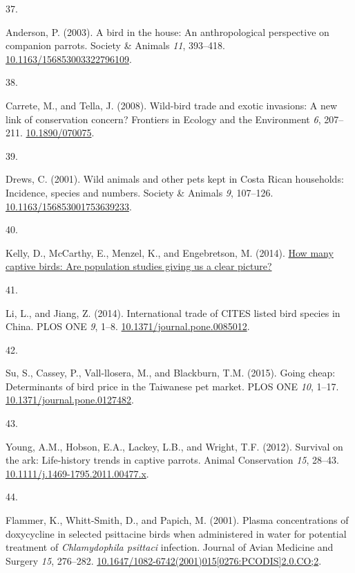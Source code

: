 \documentclass[
  man, donotrepeattitle,floatsintext]{apa6}
\newlength{\cslhangindent}
\newlength{\csllabelwidth}
\newlength{\cslentryspacingunit} %
\newenvironment{CSLReferences}[2] %
 {%
  \setlength{\parindent}{0pt}
  \ifodd #1
  \let\oldpar\par
  \def\par{\hangindent=\cslhangindent\oldpar}
  \fi
  \setlength{\parskip}{#2\cslentryspacingunit}
 }%
 {}
\newcommand{\CSLLeftMargin}[1]{\parbox[t]{\csllabelwidth}{#1}}
\newcommand{\CSLRightInline}[1]{\parbox[t]{\linewidth - \csllabelwidth}{#1}\break}
\begin{document}
\begin{CSLReferences}{0}{0}
\leavevmode{}%
\CSLLeftMargin{37. }%
\CSLRightInline{Anderson, P. (2003). A bird in the house: An anthropological perspective on companion parrots. Society \& Animals \emph{11}, 393--418. \href{https://doi.org/10.1163/156853003322796109}{10.1163/156853003322796109}.}

\leavevmode{}%
\CSLLeftMargin{38. }%
\CSLRightInline{Carrete, M., and Tella, J. (2008). Wild-bird trade and exotic invasions: A new link of conservation concern? Frontiers in Ecology and the Environment \emph{6}, 207--211. \href{https://doi.org/10.1890/070075}{10.1890/070075}.}

\leavevmode{}%
\CSLLeftMargin{39. }%
\CSLRightInline{Drews, C. (2001). Wild animals and other pets kept in {C}osta {R}ican households: Incidence, species and numbers. Society \& Animals \emph{9}, 107--126. \href{https://doi.org/10.1163/156853001753639233}{10.1163/156853001753639233}.}

\leavevmode{}%
\CSLLeftMargin{40. }%
\CSLRightInline{Kelly, D., McCarthy, E., Menzel, K., and Engebretson, M. (2014). \href{https://www.avianwelfare.org/issues/overview.htm}{How many captive birds: Are population studies giving us a clear picture?}}

\leavevmode{}%
\CSLLeftMargin{41. }%
\CSLRightInline{Li, L., and Jiang, Z. (2014). International trade of {CITES} listed bird species in {C}hina. PLOS ONE \emph{9}, 1--8. \href{https://doi.org/10.1371/journal.pone.0085012}{10.1371/journal.pone.0085012}.}

\leavevmode{}%
\CSLLeftMargin{42. }%
\CSLRightInline{Su, S., Cassey, P., Vall-llosera, M., and Blackburn, T.M. (2015). Going cheap: Determinants of bird price in the {T}aiwanese pet market. PLOS ONE \emph{10}, 1--17. \href{https://doi.org/10.1371/journal.pone.0127482}{10.1371/journal.pone.0127482}.}

\leavevmode{}%
\CSLLeftMargin{43. }%
\CSLRightInline{Young, A.M., Hobson, E.A., Lackey, L.B., and Wright, T.F. (2012). Survival on the ark: Life-history trends in captive parrots. Animal Conservation \emph{15}, 28--43. \href{https://doi.org/10.1111/j.1469-1795.2011.00477.x}{10.1111/j.1469-1795.2011.00477.x}.}

\leavevmode{}%
\CSLLeftMargin{44. }%
\CSLRightInline{Flammer, K., Whitt-Smith, D., and Papich, M. (2001). Plasma concentrations of doxycycline in selected psittacine birds when administered in water for potential treatment of \emph{{C}hlamydophila psittaci} infection. Journal of Avian Medicine and Surgery \emph{15}, 276--282. \href{https://doi.org/10.1647/1082-6742(2001)015\%5B0276:PCODIS\%5D2.0.CO;2}{10.1647/1082-6742(2001)015{[}0276:PCODIS{]}2.0.CO;2}.}


\end{CSLReferences}
\end{document}
